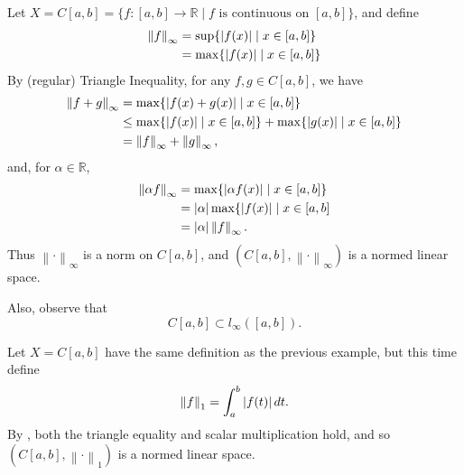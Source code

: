 \documentclass[notoc,notitlepage]{tufte-book}
\newcommand{\norm}[1]{\left\| #1 \right\|}
\begin{document}
\begin{eg}
  Let $X = C[a, b] = \{ f : [a, b] \to \mathbb{R} \mid f \text{ is continuous on } [a, b] \}$, and define
  \begin{align*}
    \norm{f}_\infty &= \sup \{ \abs{f(x)} \mid x \in [a, b] \} \\
                    &= \max \{ \abs{f(x)} \mid x \in [a, b] \}
  \end{align*}
  By (regular) Triangle Inequality, for any $f, g \in C[a, b]$, we have
  \begin{align*}
    \norm{f + g}_\infty &= \max \{ \abs{ f(x) + g(x) } \mid x \in [a, b] \} \\
                        &\leq \max \{ \abs{f(x)} \mid x \in [a, b] \} + \max \{ \abs{g(x)} \mid x \in [a, b] \} \\
                        &= \norm{f}_\infty + \norm{g}_\infty,
  \end{align*}
  and, for $\alpha \in \mathbb{R}$,
  \begin{align*}
    \norm{\alpha f}_\infty &= \max \{ \abs{ \alpha f(x) } \mid x \in [a, b] \} \\
                           &= \abs{\alpha} \max \{ \abs{f(x)} \mid x \in [a, b] \\
                           &= \abs{\alpha} \norm{f}_\infty.
  \end{align*}
  Thus $\norm\cdot_\infty$ is a norm on $C[a, b]$, and $( C[a, b], \norm\cdot_\infty )$ is a normed linear space.

  Also, observe that
  \begin{equation*}
    C[a, b] \subset l_\infty( [a, b] ).
  \end{equation*}
\end{eg}

\begin{eg}
  Let $X = C[a, b]$  have the same definition as the previous example, but this time define
  \begin{equation*}
    \norm{f}_1 = \int_{a}^{b} \abs{f(t)} \dif{t}.
  \end{equation*}
  By , both the triangle equality and scalar multiplication hold, and so $(C[a, b], \norm\cdot_1)$ is a normed linear space.
\end{eg}
\end{document}
